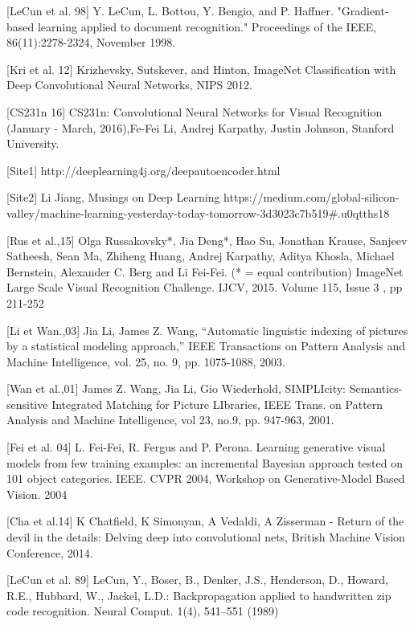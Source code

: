 [LeCun et al. 98] Y. LeCun, L. Bottou, Y. Bengio, and P. Haffner. "Gradient-based learning applied to document recognition." Proceedings of the IEEE, 86(11):2278-2324, November 1998. 

[Kri et al. 12] Krizhevsky, Sutskever, and Hinton, ImageNet Classification with Deep Convolutional Neural Networks, NIPS 2012.

[CS231n 16] CS231n: Convolutional Neural Networks for Visual Recognition (January - March, 2016),Fe-Fei Li, Andrej Karpathy, Justin Johnson, Stanford University.

[Site1] http://deeplearning4j.org/deepautoencoder.html

[Site2] Li Jiang, Musings on Deep Learning https://medium.com/global-silicon-valley/machine-learning-yesterday-today-tomorrow-3d3023c7b519\#.u0qtths18



[Rus et al.,15] Olga Russakovsky*, Jia Deng*, Hao Su, Jonathan Krause, Sanjeev Satheesh, Sean Ma, Zhiheng Huang, Andrej Karpathy, Aditya Khosla, Michael Bernstein, Alexander C. Berg and Li Fei-Fei. (* = equal contribution) ImageNet Large Scale Visual Recognition Challenge. IJCV, 2015. Volume 115, Issue 3 , pp 211-252 

[Li et Wan.,03] Jia Li, James Z. Wang, ``Automatic linguistic indexing of pictures by a statistical modeling approach,'' IEEE Transactions on Pattern Analysis and Machine Intelligence, vol. 25, no. 9, pp. 1075-1088, 2003.

[Wan et al.,01] James Z. Wang, Jia Li, Gio Wiederhold, SIMPLIcity: Semantics-sensitive Integrated Matching for Picture LIbraries, IEEE Trans. on Pattern Analysis and Machine Intelligence, vol 23, no.9, pp. 947-963, 2001.

[Fei et al. 04] L. Fei-Fei, R. Fergus and P. Perona. Learning generative visual models from few training examples: an incremental Bayesian approach tested on 101 object categories. IEEE. CVPR 2004, Workshop on Generative-Model Based Vision. 2004

[Cha et al.14] K Chatfield, K Simonyan, A Vedaldi, A Zisserman - Return of the devil in the details: Delving deep into convolutional nets, British Machine Vision Conference, 2014.




[LeCun et al. 89] LeCun, Y., Boser, B., Denker, J.S., Henderson, D., Howard, R.E., Hubbard, W., Jackel, L.D.: Backpropagation applied to handwritten zip code recognition. Neural
Comput. 1(4), 541–551 (1989)

